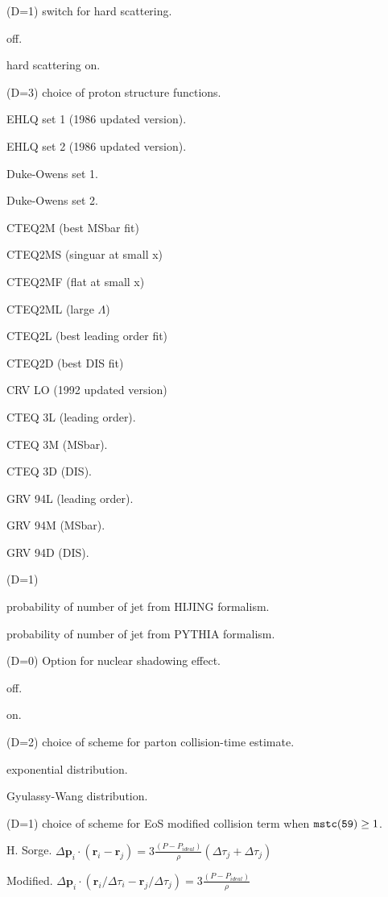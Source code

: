 \documentclass[]{article}
\newenvironment{entry}%
{\begin{list}{}{\setlength{\topsep}{0mm} \setlength{\itemsep}{0mm}
\setlength{\parskip}{0mm} \setlength{\parsep}{0mm}
\setlength{\leftmargin}{20mm} \setlength{\rightmargin}{0mm}
\setlength{\labelwidth}{18mm} \setlength{\labelsep}{2mm}}}%
{\end{list}}
\newenvironment{subentry}%
{\begin{list}{}{\setlength{\topsep}{0mm} \setlength{\itemsep}{0mm}
\setlength{\parskip}{0mm} \setlength{\parsep}{0mm}
\setlength{\leftmargin}{10mm} \setlength{\rightmargin}{0mm}
\setlength{\labelwidth}{18mm} \setlength{\labelsep}{2mm}}}%
{\end{list}}
\newcommand{\ttt}[1]{{\tt#1}}
\newcommand{\itemt}[1]{\item[{\tt #1}\hfill]}
\begin{document}
\begin{entry}
\medskip

\itemt{mstc(81) :} (D=1)  switch for hard scattering.
 \begin{subentry}
    \itemt{$=0$ :} off.
    \itemt{$=1$ :} hard scattering on.
 \end{subentry}

\itemt{mstc(82) :}(D=3) choice of proton structure functions.
 \begin{subentry}
    \itemt{$=1$ :} EHLQ set 1 (1986 updated version).
    \itemt{$=2$ :} EHLQ set 2 (1986 updated version).
    \itemt{$=3$ :} Duke-Owens set 1.
    \itemt{$=4$ :} Duke-Owens set 2.
    \itemt{$=5$ :} CTEQ2M (best MSbar fit)
    \itemt{$=6$ :} CTEQ2MS (singuar at small x)
    \itemt{$=7$ :} CTEQ2MF (flat at small x)
    \itemt{$=8$ :} CTEQ2ML (large $\Lambda$)
    \itemt{$=9$ :} CTEQ2L (best leading order fit)
    \itemt{$=10$ :} CTEQ2D (best DIS fit)
    \itemt{$=11$ :} CRV LO (1992 updated version)
    \itemt{$=12$ :} CTEQ 3L (leading order). 
    \itemt{$=13$ :} CTEQ 3M (MSbar).
    \itemt{$=14$ :} CTEQ 3D (DIS).
    \itemt{$=15$ :} GRV 94L (leading order).  %
    \itemt{$=16$ :} GRV 94M (MSbar).
    \itemt{$=17$ :} GRV 94D (DIS).
 \end{subentry}

\itemt{mstc(83) :}(D=1) 
 \begin{subentry}
     \itemt{$=1$ :} probability of number of jet from HIJING formalism.
     \itemt{$=2$ :} probability of number of jet from PYTHIA formalism.
 \end{subentry}

\itemt{mstc(84) :}(D=0) Option for nuclear shadowing effect.
 \begin{subentry}
            \itemt{$=0$ :} off.
            \itemt{$=1$ :} on.
 \end{subentry}

\itemt{mstc(85) :}(D=2) choice of scheme for parton collision-time estimate.
 \begin{subentry}
            \itemt{$=1$ :} exponential distribution.
            \itemt{$=2$ :} Gyulassy-Wang distribution.
 \end{subentry}

\itemt{mstc(86) :}(D=1) choice of scheme for EoS modified collision term
when $\ttt{mstc(59)}\geq 1$.
 \begin{subentry}
            \itemt{$=1$ :} H. Sorge.
     $\Delta\bm{p}_i \cdot (\bm{r}_i-\bm{r}_j)
	  = 3\frac{(P-P_{ideal})}{\rho}(\Delta\tau_j+\Delta\tau_j)$
            \itemt{$=2$ :} Modified.
     $\Delta\bm{p}_i \cdot (\bm{r}_i/\Delta\tau_i-\bm{r}_j/\Delta\tau_j)
	  = 3\frac{(P-P_{ideal})}{\rho}$
 \end{subentry}


\end{entry}
\end{document}
